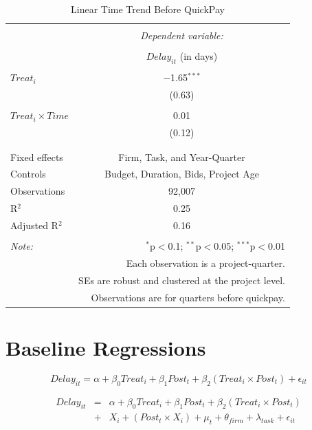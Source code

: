 \documentclass[
]{article}
\begin{document}
\begin{table}[H] \centering 
  \caption{Linear Time Trend Before QuickPay} 
  \label{} 
\small 
\begin{tabular}{@{\extracolsep{5pt}}lc} 
\\[-1.8ex]\hline 
\hline \\[-1.8ex] 
 & \multicolumn{1}{c}{\textit{Dependent variable:}} \\ 
\cline{2-2} 
\\[-1.8ex] & $Delay_{it}$ (in days) \\ 
\hline \\[-1.8ex] 
 $Treat_i$ & $-$1.65$^{***}$ \\ 
  & (0.63) \\ 
  & \\ 
 $Treat_i \times Time$ & 0.01 \\ 
  & (0.12) \\ 
  & \\ 
\hline \\[-1.8ex] 
Fixed effects & Firm, Task, and Year-Quarter \\ 
Controls & Budget, Duration, Bids, Project Age \\ 
Observations & 92,007 \\ 
R$^{2}$ & 0.25 \\ 
Adjusted R$^{2}$ & 0.16 \\ 
\hline 
\hline \\[-1.8ex] 
\textit{Note:}  & \multicolumn{1}{r}{$^{*}$p$<$0.1; $^{**}$p$<$0.05; $^{***}$p$<$0.01} \\ 
 & \multicolumn{1}{r}{Each observation is a project-quarter.} \\ 
 & \multicolumn{1}{r}{SEs are robust and clustered at the project level.} \\ 
 & \multicolumn{1}{r}{Observations are for quarters before quickpay.} \\ 
\end{tabular} 
\end{table}

\hypertarget{baseline-regressions}{%
\section{Baseline Regressions}\label{baseline-regressions}}

\[ Delay_{it} = \alpha+\beta_0 Treat_i + \beta_1 Post_t + \beta_2 (Treat_i \times Post_t) + \epsilon_{it}\]

\[ \begin{aligned} Delay_{it} &=& \alpha+\beta_0 Treat_i + \beta_1 Post_t + \beta_2 (Treat_i \times Post_t)\\
&+&  X_i + (Post_t \times X_i) + \mu_t + \theta_{firm} + \lambda_{task}+ \epsilon_{it}
\end{aligned}\]
\end{document}
